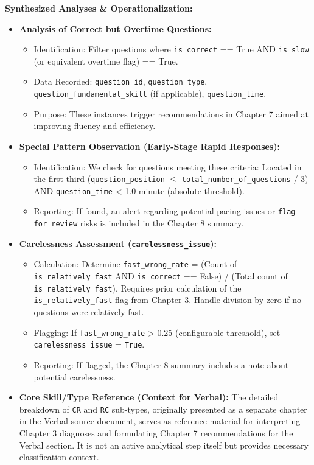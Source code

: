 \documentclass{article}
\begin{document}
\textbf{Synthesized Analyses \& Operationalization:}
\begin{itemize}
    \item \textbf{Analysis of Correct but Overtime Questions:}
    \begin{itemize}
        \item Identification: Filter questions where \texttt{is\_correct} == True AND \texttt{is\_slow} (or equivalent overtime flag) == True.
        \item Data Recorded: \texttt{question\_id}, \texttt{question\_type}, \texttt{question\_fundamental\_skill} (if applicable), \texttt{question\_time}.
        \item Purpose: These instances trigger recommendations in Chapter 7 aimed at improving fluency and efficiency.
    \end{itemize}
    \item \textbf{Special Pattern Observation (Early-Stage Rapid Responses):}
    \begin{itemize}
        \item Identification: We check for questions meeting these criteria:
        Located in the first third (\texttt{question\_position} $\leq$ \texttt{total\_number\_of\_questions} / 3) AND \texttt{question\_time} < 1.0 minute (absolute threshold).
        \item Reporting: If found, an alert regarding potential pacing issues or \texttt{flag for review} risks is included in the Chapter 8 summary.
    \end{itemize}
    \item \textbf{Carelessness Assessment (\texttt{carelessness\_issue}):}
    \begin{itemize}
        \item Calculation: Determine \texttt{fast\_wrong\_rate} = (Count of \texttt{is\_relatively\_fast} AND \texttt{is\_correct} == False) / (Total count of \texttt{is\_relatively\_fast}). Requires prior calculation of the \texttt{is\_relatively\_fast} flag from Chapter 3. Handle division by zero if no questions were relatively fast.
        \item Flagging: If \texttt{fast\_wrong\_rate} > 0.25 (configurable threshold), set \texttt{carelessness\_issue} = \texttt{True}.
        \item Reporting: If flagged, the Chapter 8 summary includes a note about potential carelessness.
    \end{itemize}
    \item \textbf{Core Skill/Type Reference (Context for Verbal):} The detailed breakdown of \texttt{CR} and \texttt{RC} sub-types, originally presented as a separate chapter in the Verbal source document, serves as reference material for interpreting Chapter 3 diagnoses and formulating Chapter 7 recommendations for the Verbal section. It is not an active analytical step itself but provides necessary classification context.
\end{itemize}
\end{document}
